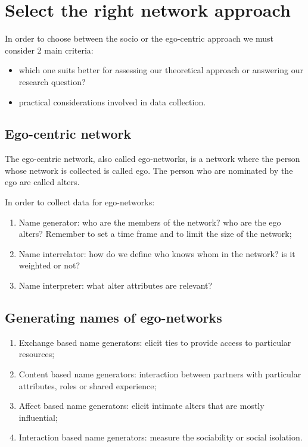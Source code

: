 \documentclass[
  notitlepage,
  onecolumn,
  openany]{book}
\providecommand{\tightlist}{%
  \setlength{\itemsep}{0pt}\setlength{\parskip}{0pt}}
\begin{document}
\hypertarget{select-the-right-network-approach}{%
\section{Select the right network approach}\label{select-the-right-network-approach}}

In order to choose between the socio or the ego-centric approach we must consider 2 main criteria:

\begin{itemize}
\tightlist
\item
  which one suits better for assessing our theoretical approach or answering our research question?
\item
  practical considerations involved in data collection.
\end{itemize}

\hypertarget{ego-centric-network}{%
\subsection{Ego-centric network}\label{ego-centric-network}}

The ego-centric network, also called ego-networks, is a network where the person whose network is collected is called ego. The person who are nominated by the ego are called alters.

In order to collect data for ego-networks:

\begin{enumerate}
\def\labelenumi{\arabic{enumi}.}
\tightlist
\item
  Name generator: who are the members of the network? who are the ego alters? Remember to set a time frame and to limit the size of the network;
\item
  Name interrelator: how do we define who knows whom in the network? is it weighted or not?
\item
  Name interpreter: what alter attributes are relevant?
\end{enumerate}

\hypertarget{generating-names-of-ego-networks}{%
\subsection{Generating names of ego-networks}\label{generating-names-of-ego-networks}}

\begin{enumerate}
\def\labelenumi{\arabic{enumi}.}
\tightlist
\item
  Exchange based name generators: elicit ties to provide access to particular resources;
\item
  Content based name generators: interaction between partners with particular attributes, roles or shared experience;
\item
  Affect based name generators: elicit intimate alters that are mostly influential;
\item
  Interaction based name generators: measure the sociability or social isolation.
\end{enumerate}
\end{document}
